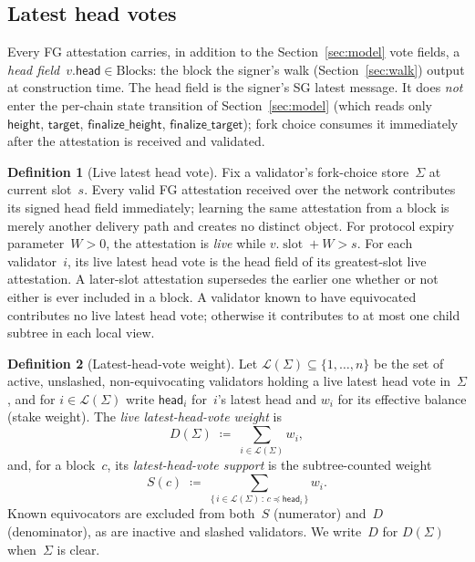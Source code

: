 \ifx\litemode\undefined\documentclass{article}\fi
\newcommand{\slot}[0]{\ensuremath{\operatorname{\mathrm{slot}}}}
\newcommand{\target}{\mathsf{target}}
\newcommand{\height}{\mathsf{height}}
\newcommand{\finalizeHeight}{\mathsf{finalize\_height}}
\newcommand{\finalizeTarget}{\mathsf{finalize\_target}}
\newcommand{\Supp}{\ensuremath{S}}          %
\newcommand{\Dvote}{\ensuremath{D}}         %
\newcommand{\Wvote}{\ensuremath{W}}         %
\newcommand{\headf}{\mathsf{head}}          %
\theoremstyle{plain}
\theoremstyle{definition}
\newtheorem{definition}{Definition}
\theoremstyle{remark}
\begin{document}
\subsection{Latest head votes}\label{sec:headvotes}

Every FG attestation carries, in addition to the Section~\ref{sec:model}
vote fields, a \emph{head field}~$v.\headf \in \mathrm{Blocks}$: the block
the signer's walk (Section~\ref{sec:walk}) output at construction time.
The head field is the signer's SG latest message.  It does \emph{not} enter
the per-chain state transition of Section~\ref{sec:model} (which reads only
$\height$, $\target$, $\finalizeHeight$, $\finalizeTarget$); fork choice
consumes it immediately after the attestation is received and validated.

\begin{definition}[Live latest head vote]\label{def:head-vote}
Fix a validator's fork-choice store~$\Sigma$ at current slot~$s$.
Every valid FG attestation received over the network contributes its signed
head field immediately; learning the same attestation from a block is merely
another delivery path and creates no distinct object.  For protocol expiry
parameter~$\Wvote>0$, the attestation is \emph{live} while
$v.\slot + \Wvote > s$.
For each validator~$i$, its live latest head vote is the head field of its
greatest-slot live attestation.  A later-slot attestation supersedes the
earlier one whether or not either is ever included in a block.  A validator
known to have equivocated contributes no live latest head vote; otherwise it
contributes to at most one child subtree in each local view.
\end{definition}

\begin{definition}[Latest-head-vote weight]\label{def:head-vote-weight}
Let $\mathcal{L}(\Sigma) \subseteq \{1,\dots,n\}$ be the set of active,
unslashed, non-equivocating validators holding a live latest head vote
in~$\Sigma$, and
for $i \in \mathcal{L}(\Sigma)$ write $\headf_i$ for~$i$'s latest head
and $w_i$ for its effective balance (stake weight).
The \emph{live latest-head-vote weight} is
\[
  \Dvote(\Sigma) \;\coloneqq\; \sum_{i \in \mathcal{L}(\Sigma)} w_i,
\]
and, for a block~$c$, its \emph{latest-head-vote support} is the subtree-counted
weight
\[
  \Supp(c) \;\coloneqq\; \sum_{\{\, i \in \mathcal{L}(\Sigma) \,:\, c \preceq \headf_i \,\}} w_i .
\]
Known equivocators are excluded from both~$\Supp$ (numerator) and~$\Dvote$
(denominator), as are inactive and slashed validators.  We write~$\Dvote$ for
$\Dvote(\Sigma)$ when~$\Sigma$ is clear.
\end{definition}
\end{document}
